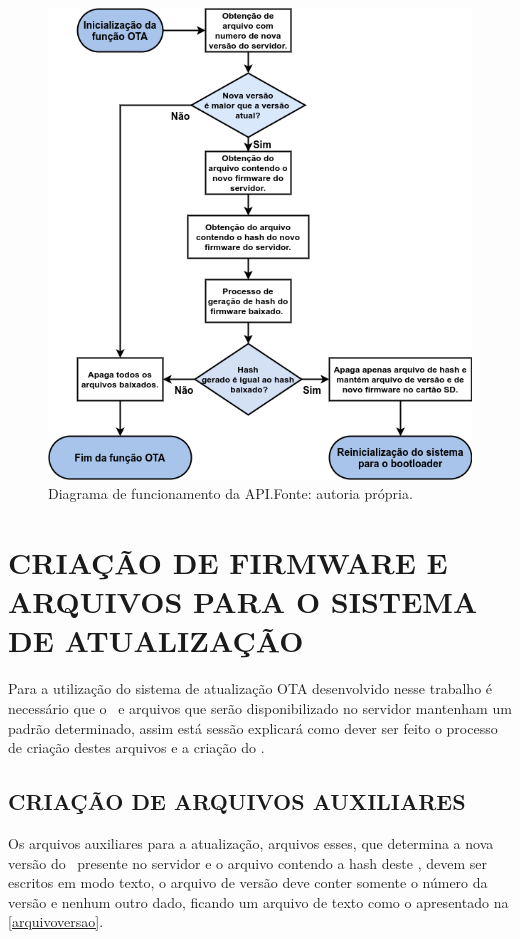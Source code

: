 \begin{figure}[H]
    \scriptsize
     \centering
     \includegraphics[scale=0.67]{dados/figuras/FuncionamentoAPI.png}
     \caption{Diagrama de funcionamento da API.\newline Fonte: autoria própria.}
     \label{fig:DiagAPI}
\end{figure}

\section{CRIAÇÃO DE FIRMWARE E ARQUIVOS PARA O SISTEMA DE ATUALIZAÇÃO}
Para a utilização do sistema de atualização OTA desenvolvido nesse trabalho é necessário que o \firmware\ e arquivos que serão disponibilizado no servidor mantenham um padrão determinado, assim está sessão explicará como dever ser feito o processo de criação destes arquivos e a criação do \firmware.

\subsection{CRIAÇÃO DE ARQUIVOS AUXILIARES}
Os arquivos auxiliares para a atualização, arquivos esses, que determina a nova versão do \firmware\ presente no servidor e o arquivo contendo a hash deste \firmware, devem ser escritos em modo texto, o arquivo de versão deve conter somente o número da versão e nenhum outro dado, ficando um arquivo de texto como o apresentado na \autoref{arquivoversao}.

